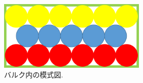 \begin{figure}[htbp]
	\begin{center}
		\includegraphics[width=70mm]{../intro/balc.png}
        \caption{バルク内の模式図.}
		\label{fig5}
	\end{center}
\end{figure}
